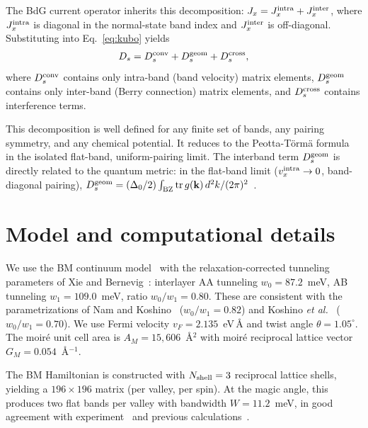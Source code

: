 \documentclass[prb,twocolumn,superscriptaddress,floatfix]{revtex4-2}
\begin{document}
The BdG current operator inherits this decomposition: $J_x = J_x^{\rm intra} + J_x^{\rm inter}$, where $J_x^{\rm intra}$ is diagonal in the normal-state band index and $J_x^{\rm inter}$ is off-diagonal.
Substituting into Eq.~\eqref{eq:kubo} yields
\begin{align}
D_s = D_s^{\rm conv} + D_s^{\rm geom} + D_s^{\rm cross},
\label{eq:decomp}
\end{align}
where $D_s^{\rm conv}$ contains only intra-band (band velocity) matrix elements, $D_s^{\rm geom}$ contains only inter-band (Berry connection) matrix elements, and $D_s^{\rm cross}$ contains interference terms.

This decomposition is well defined for any finite set of bands, any pairing symmetry, and any chemical potential.
It reduces to the Peotta-T\"orm\"a formula~\cite{peotta_torma_2015} in the isolated flat-band, uniform-pairing limit.
The interband term $D_s^{\rm geom}$ is directly related to the quantum metric: in the flat-band limit ($v_x^{\rm intra} \to 0$, band-diagonal pairing), $D_s^{\rm geom} = (\Delta_0/2) \int_{\rm BZ} \mathrm{tr}\,g(\mathbf{k}) \, d^2k / (2\pi)^2$~\cite{peotta_torma_2015,torma_review_2022}.

\section{Model and computational details}

We use the BM continuum model~\cite{bistritzer_2011} with the relaxation-corrected tunneling parameters of Xie and Bernevig~\cite{xie_2020_prl}: interlayer AA tunneling $w_0 = 87.2$~meV, AB tunneling $w_1 = 109.0$~meV, ratio $w_0/w_1 = 0.80$.
These are consistent with the parametrizations of Nam and Koshino~\cite{nam_2017} ($w_0/w_1 = 0.82$) and Koshino \textit{et al.}~\cite{koshino_2018} ($w_0/w_1 = 0.70$).
We use Fermi velocity $v_F = 2.135$~eV\,\AA{} and twist angle $\theta = 1.05^\circ$.
The moiré unit cell area is $A_M = 15{,}606$~\AA$^2$ with moiré reciprocal lattice vector $G_M = 0.054$~\AA$^{-1}$.

The BM Hamiltonian is constructed with $N_{\rm shell} = 3$ reciprocal lattice shells, yielding a $196 \times 196$ matrix (per valley, per spin).
At the magic angle, this produces two flat bands per valley with bandwidth $W = 11.2$~meV, in good agreement with experiment~\cite{cao_sc_2018} and previous calculations~\cite{bistritzer_2011,koshino_2018}.
\end{document}
